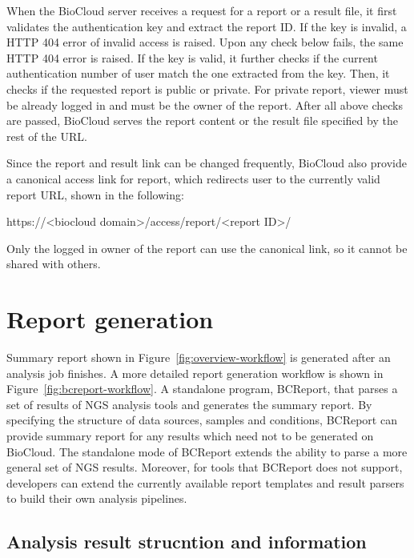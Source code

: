 When the BioCloud server receives a request for a report or a result file, it
first validates the authentication key and extract the report ID. If the key is
invalid, a HTTP 404 error of invalid access is raised. Upon any check below
fails, the same HTTP 404 error is raised. If the key is valid, it further
checks if the current authentication number of user match the one extracted
from the key. Then, it checks if the requested report is public or private. For
private report, viewer must be already logged in and must be the owner of the
report. After all above checks are passed, BioCloud serves the report content
or the result file specified by the rest of the URL.

Since the report and result link can be changed frequently, BioCloud also
provide a canonical access link for report, which redirects user to the
currently valid report URL, shown in the following:

\begin{CVerbatim}[fontsize=\small]
https://<biocloud domain>/access/report/<report ID>/
\end{CVerbatim}

\vspace{-1em}\noindent
Only the logged in owner of the report can use the canonical link, so it cannot
be shared with others.



\section{Report generation}
\label{s:report-generation}

Summary report shown in Figure~\ref{fig:overview-workflow} is generated after
an analysis job finishes. A more detailed report generation workflow is shown
in Figure~\ref{fig:bcreport-workflow}. A standalone program, BCReport, that
parses a set of results of NGS analysis tools and generates the summary report.
By specifying the structure of data sources, samples and conditions, BCReport
can provide summary report for any results which need not to be generated on
BioCloud. The standalone mode of BCReport extends the ability to parse a more
general set of NGS results. Moreover, for tools that BCReport does not support,
developers can extend the currently available report templates and result
parsers to build their own analysis pipelines.




\subsection{Analysis result strucntion and information}

